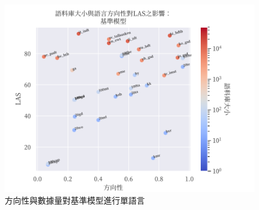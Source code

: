 \begin{figure}[h]
    \centering
    \includegraphics{figs/chapter3/dir_size_las_ft_multi.pdf}
    \caption{方向性與數據量對基準模型進行單語言}
    \label{fig:dir-size-las-ft-multi}
\end{figure}